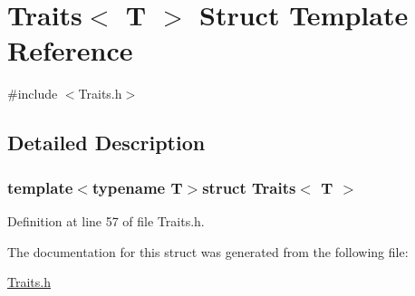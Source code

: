\hypertarget{struct_traits}{\section{Traits$<$ T $>$ Struct Template Reference}
\label{struct_traits}
}


{\ttfamily \#include $<$Traits.\-h$>$}



\subsection{Detailed Description}
\subsubsection*{template$<$typename T$>$struct Traits$<$ T $>$}



Definition at line 57 of file Traits.\-h.



The documentation for this struct was generated from the following file\-:\begin{DoxyCompactItemize}
\item 
\hyperlink{_traits_8h}{Traits.\-h}\end{DoxyCompactItemize}
